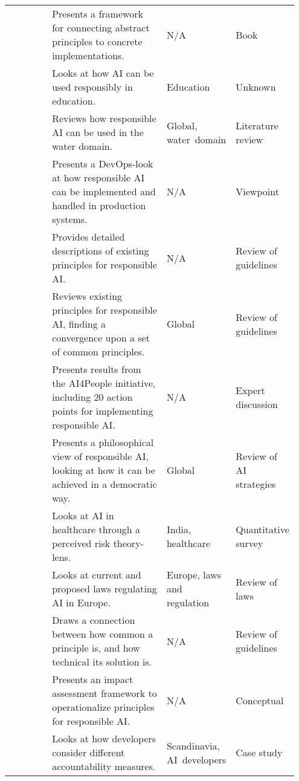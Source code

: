 \begin{landscape}
\begin{ThreePartTable}
\begin{longtable}{P{0.2\linewidth}P{0.45\linewidth}P{0.15\linewidth}P{0.15\linewidth}}
        \textcite{Dignum_2019} & Presents a framework for connecting abstract principles to concrete \mbox{implementations}. & N/A\tnote{*} & Book\tnote{\textdaggerdbl} \\ 
        \textcite{Dignum_2021} & Looks at how AI can be used responsibly in education. & Education & Unknown\tnote{\textdagger} \\ 
        \textcite{Doorn_2021} & Reviews how responsible AI can be used in the water domain. & Global, \mbox{water domain} & Literature review \\ 
        \textcite{Eitel-Porter_2021} & Presents a DevOps-look at how responsible AI can be implemented and handled in production systems. & N/A\tnote{*} & Viewpoint \\ 
        \textcite{Fjeld_2020} & Provides detailed descriptions of existing principles for responsible AI. & N/A\tnote{*} & Review of guidelines \\ 
        \textcite{Floridi_2019} & Reviews existing principles for responsible AI, finding a convergence upon a set of common principles. & Global & Review of guidelines \\ 
        \textcite{Floridi_2018} & Presents results from the AI4People initiative, including 20 action points for \mbox{implementing} responsible AI. & N/A\tnote{*} & Expert discussion \\ 
        \textcite{Gianni_2022} & Presents a philosophical view of responsible AI, looking at how it can be achieved in a democratic way. & Global & Review of AI strategies \\ 
        \textcite{Gupta_2021} & Looks at AI in healthcare through a perceived risk theory-lens. & India, healthcare & Quantitative survey \\ 
        \textcite{Hacker_2022} & Looks at current and proposed laws regulating AI in Europe. & Europe, laws and regulation & Review of laws \\ 
        \textcite{Hagendorff_2020} & Draws a connection between how common a principle is, and how \mbox{technical} its solution is. & N/A\tnote{*} & Review of guidelines \\ 
        \textcite{Havrda_2020} & Presents an impact assessment framework to operationalize principles for \mbox{responsible} AI. & N/A\tnote{*} & Conceptual \\ 
        \textcite{Henriksen_2021} & Looks at how developers consider different accountability measures. & Scandinavia, \mbox{AI developers} & Case study \\ 

\end{longtable}
\end{ThreePartTable}
\end{landscape}

